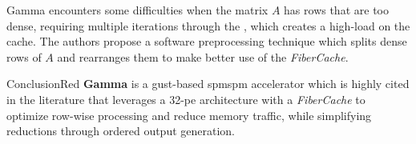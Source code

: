 Gamma encounters some difficulties when the matrix $A$ has rows that are too dense, requiring multiple iterations through the , which creates a high-load on the cache.
The authors propose a software preprocessing technique which splits dense rows of $A$ and rearranges them to make better use of the \textit{FiberCache}.

\begin{highlight}{Conclusion}{Red}
    \textbf{Gamma} is a \acrlong{gust}-based \acrshort{spmspm} accelerator which is highly cited in the literature that leverages a 32-\acrshort{pe} architecture with a \textit{FiberCache} to optimize row-wise processing and reduce memory traffic, while simplifying \glspl{reduction} through ordered output generation.
\end{highlight}